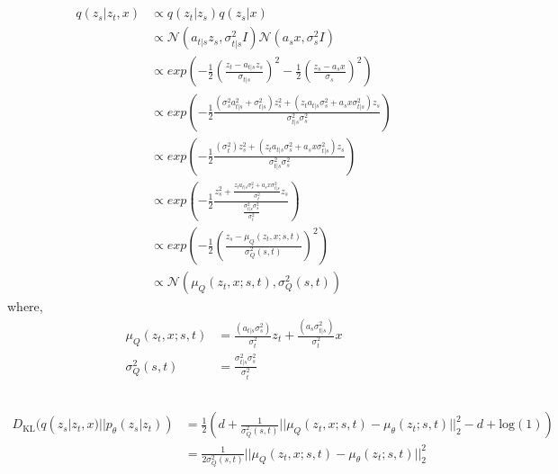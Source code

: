 \documentclass{article}
\begin{document}
\subsection{}
\begin{align*} 
    q(z_s|z_t, x) 
    &\propto q(z_t|z_s)q(z_s|x) \\
    &\propto \mathcal{N}(a_{t|s}z_s, \sigma_{t|s}^2I) \mathcal{N}(a_{s}x, \sigma_{s}^2I) \\
    &\propto exp(-\frac{1}{2}(\frac{z_t - a_{t|s}z_s}{\sigma_{t|s}})^2 -\frac{1}{2}(\frac{z_s - a_sx}{\sigma_{s}})^2) \\
    &\propto exp(-\frac{1}{2}\frac{(\sigma_s^2a_{t|s}^2 + \sigma_{t|s}^2)z_s^2 + (z_ta_{t|s}\sigma_s^2 + a_sx\sigma_{t|s}^2)z_s}{\sigma_{t|s}^2\sigma_s^2}) \\
    &\propto exp(-\frac{1}{2}\frac{(\sigma_t^2)z_s^2 + (z_ta_{t|s}\sigma_s^2 + a_sx\sigma_{t|s}^2)z_s}{\sigma_{t|s}^2\sigma_s^2}) \\
    &\propto exp(-\frac{1}{2}\frac{z_s^2 + \frac{z_ta_{t|s}\sigma_s^2 + a_sx\sigma_{t|s}^2}{\sigma_t^2}z_s}{\frac{\sigma_{t|s}^2\sigma_s^2}{\sigma_t^2}}) \\
    &\propto exp(-\frac{1}{2}(\frac{z_s - \mu_Q(z_t, x; s, t)}{\sigma_Q^2(s, t)})^2) \\
    &\propto \mathcal{N}(\mu_Q(z_t, x; s, t), \sigma_Q^2(s, t)) 
\end{align*}
where,
\begin{align*}
    \mu_Q(z_t, x; s, t) &= \frac{(a_{t|s}\sigma_s^2)}{\sigma_t^2}z_t + \frac{(a_s\sigma_{t|s}^2)}{\sigma_t^2}x\\
    \sigma_Q^2(s, t) &= \frac{\sigma_{t|s}^2\sigma_s^2}{\sigma_t^2}
\end{align*}


\subsection{}
\begin{align*}
    D_{\text{KL}}(q(z_s|z_t, x) || p_{\theta}(z_s|z_t)) 
    &= \frac{1}{2}(d + \frac{1}{\sigma_Q^2(s, t)}||\mu_Q(z_t, x; s, t) - \mu_{\theta}(z_t;s, t)||_2^2 - d + \text{log} (1)) \\
    &= \frac{1}{2\sigma_Q^2(s, t)}||\mu_Q(z_t, x; s, t) - \mu_{\theta}(z_t;s, t)||_2^2\\
\end{align*}
\end{document}
